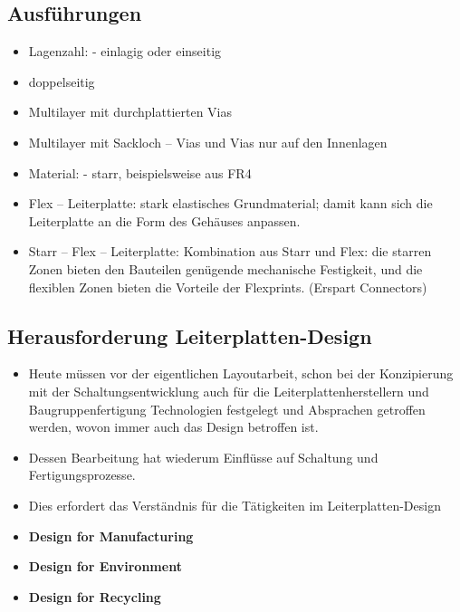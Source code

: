 \subsection{Ausführungen}
\begin{itemize}
  \item Lagenzahl: - einlagig oder einseitig
  \item doppelseitig
  \item  Multilayer mit durchplattierten Vias
  \item  Multilayer mit Sackloch – Vias und Vias nur auf den Innenlagen
  \item Material: - starr, beispielsweise aus FR4
  \item Flex – Leiterplatte: stark elastisches Grundmaterial; damit kann sich
  die Leiterplatte an die Form des Gehäuses anpassen.
  \item Starr – Flex – Leiterplatte: Kombination aus Starr und Flex: die starren
  Zonen bieten den Bauteilen genügende mechanische Festigkeit, und die flexiblen
  Zonen bieten die Vorteile der Flexprints. (Erspart Connectors)
\end{itemize}
\newpage
\subsection{Herausforderung Leiterplatten-Design}
\begin{itemize}
  \item Heute müssen vor der eigentlichen Layoutarbeit, schon bei der
  Konzipierung mit der Schaltungsentwicklung auch für die
  Leiterplattenherstellern und Baugruppenfertigung Technologien festgelegt und Absprachen getroffen werden, wovon immer auch das Design betroffen ist.
  \item Dessen Bearbeitung hat wiederum Einflüsse auf Schaltung und
  Fertigungsprozesse.
  \item Dies erfordert das Verständnis für die Tätigkeiten im
  Leiterplatten-Design
  \item \textbf{Design for Manufacturing}
  \item \textbf{Design for Environment}
  \item \textbf{Design for Recycling}
\end{itemize}

